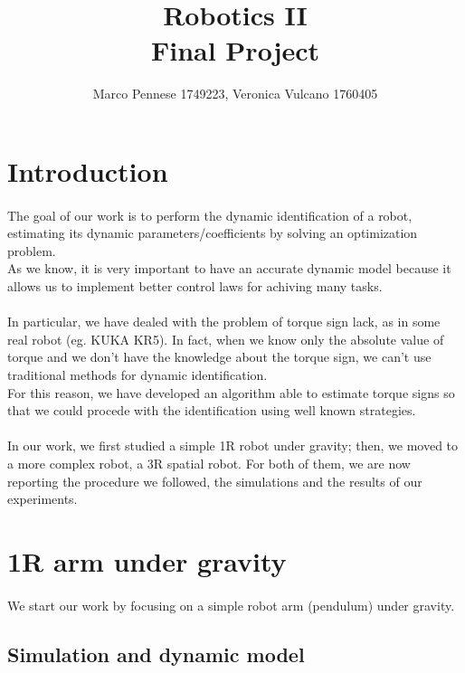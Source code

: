 \documentclass{article}
\title{\textbf{Robotics II} \\ \large{\textbf{Final Project}}}
\author{Marco Pennese 1749223, Veronica Vulcano 1760405}
\date{}
\begin{document}
\maketitle
\tableofcontents
\pagebreak

\section{Introduction}
\paragraph{}The goal of our work is to perform the dynamic identification of a robot, estimating its dynamic parameters/coefficients by solving an optimization problem.\\
As we know, it is very important to have an accurate dynamic model because it allows us to implement better control laws for achiving many tasks.\\\\
In particular, we have dealed with the problem of torque sign lack, as in some real robot (eg. KUKA KR5). In fact, when we know only the absolute value of torque and we don't have the knowledge about the torque sign, we can't use traditional methods for dynamic identification.\\
For this reason, we have developed an algorithm able to estimate torque signs so that we could procede with the identification using well known strategies.
\paragraph{}In our work, we first studied a simple 1R robot under gravity; then, we moved to a more complex robot, a 3R spatial robot. For both of them, we are now reporting the procedure we followed, the simulations and the results of our experiments.
\section{1R arm under gravity}
\paragraph{}We start our work by focusing on a simple robot arm (pendulum) under gravity.
\subsection{Simulation and dynamic model}
\end{document}
